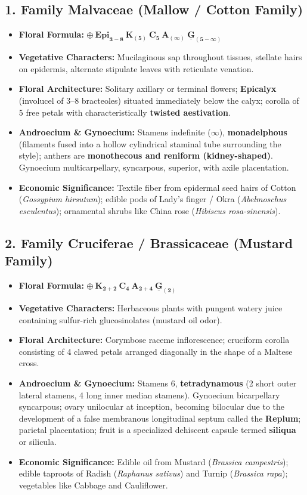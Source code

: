 \documentclass[10pt,twoside,openright]{book}
\begin{document}
\subsection{1. Family Malvaceae (Mallow / Cotton Family)}
\begin{itemize}
  \item \textbf{Floral Formula:} $\mathbf{\oplus\:\text{Epi}_{3-8}\:\text{K}_{(5)}\:\text{C}_5\:\text{A}_{(\infty)}\:\underline{\text{G}}_{(5-\infty)}}$
  \item \textbf{Vegetative Characters:} Mucilaginous sap throughout tissues, stellate hairs on epidermis, alternate stipulate leaves with reticulate venation.
  \item \textbf{Floral Architecture:} Solitary axillary or terminal flowers; \textbf{Epicalyx} (involucel of 3--8 bracteoles) situated immediately below the calyx; corolla of 5 free petals with characteristically \textbf{twisted aestivation}.
  \item \textbf{Androecium \& Gynoecium:} Stamens indefinite ($\infty$), \textbf{monadelphous} (filaments fused into a hollow cylindrical staminal tube surrounding the style); anthers are \textbf{monothecous and reniform (kidney-shaped)}. Gynoecium multicarpellary, syncarpous, superior, with axile placentation.
  \item \textbf{Economic Significance:} Textile fiber from epidermal seed hairs of Cotton (\textit{Gossypium hirsutum}); edible pods of Lady's finger / Okra (\textit{Abelmoschus esculentus}); ornamental shrubs like China rose (\textit{Hibiscus rosa-sinensis}).
\end{itemize}

\subsection{2. Family Cruciferae / Brassicaceae (Mustard Family)}
\begin{itemize}
  \item \textbf{Floral Formula:} $\mathbf{\oplus\:\text{K}_{2+2}\:\text{C}_{4}\:\text{A}_{2+4}\:\underline{\text{G}}_{(2)}}$
  \item \textbf{Vegetative Characters:} Herbaceous plants with pungent watery juice containing sulfur-rich glucosinolates (mustard oil odor).
  \item \textbf{Floral Architecture:} Corymbose raceme inflorescence; cruciform corolla consisting of 4 clawed petals arranged diagonally in the shape of a Maltese cross.
  \item \textbf{Androecium \& Gynoecium:} Stamens 6, \textbf{tetradynamous} (2 short outer lateral stamens, 4 long inner median stamens). Gynoecium bicarpellary syncarpous; ovary unilocular at inception, becoming bilocular due to the development of a false membranous longitudinal septum called the \textbf{Replum}; parietal placentation; fruit is a specialized dehiscent capsule termed \textbf{siliqua} or silicula.
  \item \textbf{Economic Significance:} Edible oil from Mustard (\textit{Brassica campestris}); edible taproots of Radish (\textit{Raphanus sativus}) and Turnip (\textit{Brassica rapa}); vegetables like Cabbage and Cauliflower.
\end{itemize}
\end{document}
